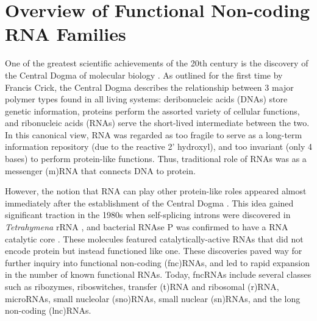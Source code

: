 \documentclass[12pt,a4paper]{report}
\begin{document}

{%
\let\oldnumberline\numberline%
\renewcommand{\numberline}{\tablename~\oldnumberline}%
\listoftables%
}





\pagebreak

\setcounter{chapter}{0}

\chapter{Overview of Functional Non-coding RNA Families}


\clearpage

One of the greatest scientific achievements of the 20th century is the discovery of the Central Dogma of molecular biology \cite{Crick1958, Crick1970}. As outlined for the first time by Francis Crick, the Central Dogma describes the relationship between 3 major polymer types found in all living systems: deribonucleic acids (DNAs) store genetic information, proteins perform the assorted variety of cellular functions, and ribonucleic acids (RNAs) serve the short-lived intermediate between the two. In this canonical view, RNA was regarded as too fragile to serve as a long-term information repository (due to the reactive 2' hydroxyl), and too invariant (only 4 bases) to perform protein-like functions. Thus, traditional role of RNAs was as a messenger (m)RNA that connects DNA to protein.

However, the notion that RNA can play other protein-like roles appeared almost immediately after the establishment of the Central Dogma \cite{Lehman2010}. This idea gained significant traction in the 1980s when self-splicing introns were discovered in \textit{Tetrahymena} rRNA \cite{Cech1982}, and bacterial RNAse P was confirmed to have a RNA catalytic core \cite{Altman1983}. These molecules featured catalytically-active RNAs that did not encode protein but instead functioned like one. These discoveries paved way for further inquiry into functional non-coding (fnc)RNAs, and led to rapid expansion in the number of known functional RNAs. Today, fncRNAs include several classes such as ribozymes, riboswitches, transfer (t)RNA and ribosomal (r)RNA, microRNAs, small nucleolar (sno)RNAs, small nuclear (sn)RNAs, and the long non-coding (lnc)RNAs.
\end{document}

